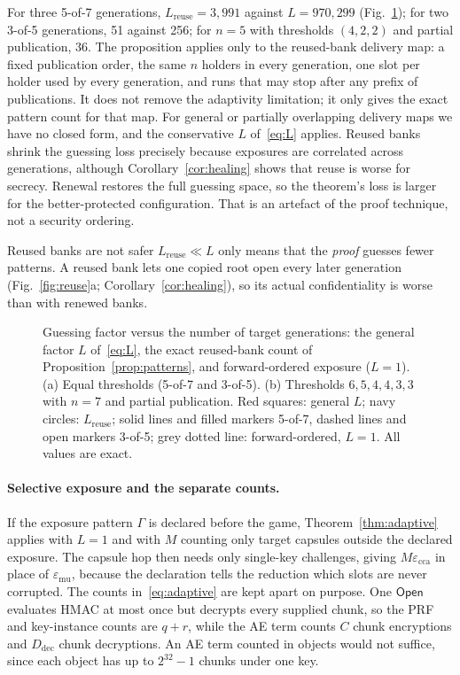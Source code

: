 \documentclass[pdflatex,sn-mathphys-num]{sn-jnl}%
\theoremstyle{plain}
\theoremstyle{definition}
\begin{document}
For three 5-of-7 generations, $L_{\mathrm{reuse}}=3{,}991$ against $L=970{,}299$ (Fig.~\ref{fig:guess}); for two 3-of-5 generations, 51 against 256; for $n=5$ with thresholds $(4,2,2)$ and partial publication, 36. The proposition applies only to the reused-bank delivery map: a fixed publication order, the same $n$ holders in every generation, one slot per holder used by every generation, and runs that may stop after any prefix of publications. It does not remove the adaptivity limitation; it only gives the exact pattern count for that map. For general or partially overlapping delivery maps we have no closed form, and the conservative $L$ of~\eqref{eq:L} applies. Reused banks shrink the guessing loss precisely because exposures are correlated across generations, although Corollary~\ref{cor:healing} shows that reuse is worse for secrecy. Renewal restores the full guessing space, so the theorem's loss is larger for the better-protected configuration. That is an artefact of the proof technique, not a security ordering.

\begin{warnbox}{Reused banks are not safer}
$L_{\mathrm{reuse}}\ll L$ only means that the \emph{proof} guesses fewer patterns. A reused bank lets one copied root open every later generation (Fig.~\ref{fig:reuse}a; Corollary~\ref{cor:healing}), so its actual confidentiality is worse than with renewed banks.
\end{warnbox}

\begin{figure}[t]
\centering
\figbox{}
\caption{Guessing factor versus the number of target generations: the general factor $L$ of~\eqref{eq:L}, the exact reused-bank count of Proposition~\ref{prop:patterns}, and forward-ordered exposure ($L=1$). (a) Equal thresholds (5-of-7 and 3-of-5). (b) Thresholds $6,5,4,4,3,3$ with $n=7$ and partial publication. Red squares: general $L$; navy circles: $L_{\mathrm{reuse}}$; solid lines and filled markers 5-of-7, dashed lines and open markers 3-of-5; grey dotted line: forward-ordered, $L=1$. All values are exact.}\label{fig:guess}
\end{figure}

\paragraph{Selective exposure and the separate counts.}
If the exposure pattern $\Gamma$ is declared before the game, Theorem~\ref{thm:adaptive} applies with $L=1$ and with $M$ counting only target capsules outside the declared exposure. The capsule hop then needs only single-key challenges, giving $M\varepsilon_{\mathrm{cca}}$ in place of $\varepsilon_{\mathrm{mu}}$, because the declaration tells the reduction which slots are never corrupted. The counts in~\eqref{eq:adaptive} are kept apart on purpose. One $\mathsf{Open}$ evaluates HMAC at most once but decrypts every supplied chunk, so the PRF and key-instance counts are $q+r$, while the AE term counts $C$ chunk encryptions and $D_{\mathrm{dec}}$ chunk decryptions. An AE term counted in objects would not suffice, since each object has up to $2^{32}-1$ chunks under one key.
\end{document}
